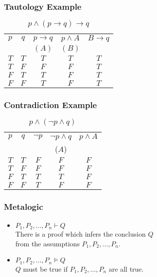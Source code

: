 \documentclass[dvipsnames]{beamer}
\begin{document}
\begin{frame}
  \frametitle{Tautology Example}

  \begin{example}
    \begin{table}
      \caption{$p \wedge (p \rightarrow q) \rightarrow q$}
      \begin{tabular}{|c|c|c|c||c|}\hline
        $p$ & $q$ & $p \rightarrow q$ & $p \wedge A$ & $B \rightarrow q$\\
            &     & $(A)$             & $(B)$        &\\\hline\hline
        $T$ & $T$ & $T$ & $T$ & $T$\\\hline
        $T$ & $F$ & $F$ & $F$ & $T$\\\hline
        $F$ & $T$ & $T$ & $F$ & $T$\\\hline
        $F$ & $F$ & $T$ & $F$ & $T$\\\hline
      \end{tabular}
    \end{table}
  \end{example}
\end{frame}

\begin{frame}
  \frametitle{Contradiction Example}

  \begin{example}
    \begin{table}
      \caption{$p \wedge (\neg p \wedge q)$}
      \begin{tabular}{|c|c|c|c||c|}\hline
        $p$ & $q$ & $\neg p$ & $\neg p \wedge q$ & $p \wedge A$\\
            &     &          & ($A$)             &\\\hline\hline
        $T$ & $T$ & $F$ & $F$ & $F$\\\hline
        $T$ & $F$ & $F$ & $F$ & $F$\\\hline
        $F$ & $T$ & $T$ & $T$ & $F$\\\hline
        $F$ & $F$ & $T$ & $F$ & $F$\\\hline
      \end{tabular}
    \end{table}
  \end{example}
\end{frame}

\begin{frame}
  \frametitle{Metalogic}

  \begin{itemize}
    \item $P_1,P_2,\dots,P_n \vdash Q$\\
      There is a proof which infers the conclusion $Q$\\
      from the assumptions $P_1,P_2,\dots,P_n$.

    \pause
    \medskip
    \item $P_1,P_2,\dots,P_n \vDash Q$\\
      $Q$ must be true if $P_1,P_2,\dots,P_n$ are all true.
  \end{itemize}
\end{frame}
\end{document}
